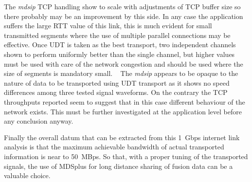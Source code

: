 \documentclass[10pt,a4paper]{article}
\begin{document}
The \emph{mdsip} TCP handling show to scale with adjustments of TCP buffer size so there probably may be an improvement by this side.
In any case the application suffers the large RTT value of this link, this is much evident for small transmitted segments where the use of multiple parallel connections may be effective.
Once UDT is taken as the best transport, two independent channels shown to perform uniformly better than the single channel, but higher values must be used with care of the network congestion and should be used where the size of segments is mandatory small.
~
The \emph{mdsip} appears to be opaque to the nature of data to be transported using UDT transport as it shows no speed differences among three tested signal waveforms.
On the contrary the TCP throughputs reported seem to suggest that in this case different behaviour of the network exists.
This must be further investigated at the application level before any conclusion anyway.

Finally the overall datum that can be extracted from this 1~Gbps internet link analysis is that the maximum achievable bandwidth of actual transported information is near to 50~MBps.
So that, with a proper tuning of the transported signals, the use of MDSplus for long distance sharing of fusion data can be a valuable choice.
\end{document}
